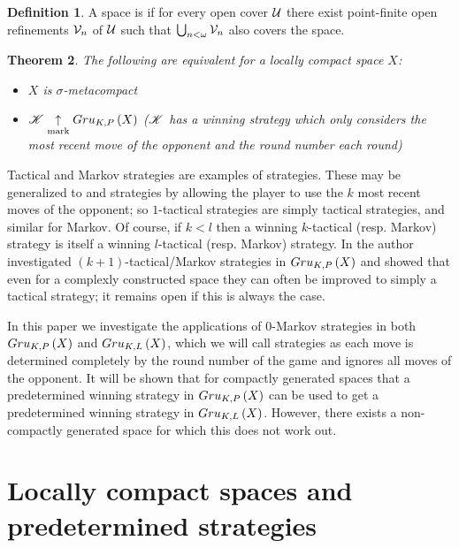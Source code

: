 \documentclass{amsart}
\newtheorem{theorem}{Theorem}[section]
\theoremstyle{definition}
\newtheorem{definition}[theorem]{Definition}
\begin{document}
\begin{definition}
  A space is  if for every open cover $\mathcal{U}$ there
  exist point-finite open refinements $\mathcal{V}_n$ of $\mathcal{U}$ such that
  $\bigcup_{n<\omega}\mathcal{V}_n$ also covers the space.
\end{definition}

\begin{theorem} \cite[Theorem 3]{MR858337}
  The following are equivalent for a locally compact space $X$:
    \begin{itemize}
      \item $X$ is $\sigma$-metacompact
      \item $\mathscr{K} \underset{\text{mark}}{\uparrow} Gru_{K,P}\left({X}\right)$ (\(\mathscr{K}\) has a 
      winning strategy which only considers the most recent move of
      the opponent and the round number each round)
    \end{itemize}
\end{theorem}

Tactical and Markov strategies are examples of 
strategies. These may be generalized to  and
 strategies by allowing the player to use the \(k\)
most recent moves of the opponent; so \(1\)-tactical strategies are
simply tactical strategies, and similar for Markov. Of course, if
\(k<l\) then a winning \(k\)-tactical (resp. Markov) strategy
is itself a winning \(l\)-tactical (resp. Markov) strategy.
In \cite{QAClontzPreprint}
the author investigated \((k+1)\)-tactical/Markov strategies in \(Gru_{K,P}\left({X}\right)\)
and showed that even for a complexly constructed space they can often be
improved to simply a tactical strategy; it remains open if this is always
the case.

In this paper we investigate the applications of \(0\)-Markov strategies
in both \(Gru_{K,P}\left({X}\right)\) and \(Gru_{K,L}\left({X}\right)\),
which we will call  strategies as each move is determined
completely by the round number of the game and ignores all moves of the
opponent. It will be shown that for compactly generated spaces that a
predetermined winning strategy in \(Gru_{K,P}\left({X}\right)\) can be used to get a
predetermined winning strategy in \(Gru_{K,L}\left({X}\right)\).
However, there exists a non-compactly generated space
for which this does not work out.

\section{Locally compact spaces and predetermined strategies}
\end{document}
